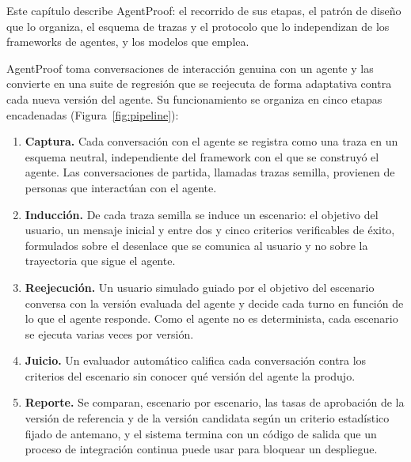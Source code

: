\clearpage
\blank
{}
\begingroup\dobleesp
\vspace{6pt}
Este capítulo describe AgentProof: el recorrido de sus etapas, el patrón de diseño que lo organiza, el esquema de trazas y el protocolo que lo independizan de los frameworks de agentes, y los modelos que emplea.
\par

AgentProof toma conversaciones de interacción genuina con un agente y las convierte en una suite de regresión que se reejecuta de forma adaptativa contra cada nueva versión del agente. Su funcionamiento se organiza en cinco etapas encadenadas (Figura~\ref{fig:pipeline}):
\par
\begin{enumerate}[label=\arabic*.,leftmargin=0.5in,labelwidth=0.25in,labelsep=0pt,align=left,itemsep=0pt,parsep=0pt,topsep=0pt]
  \item \textbf{Captura.} Cada conversación con el agente se registra como una traza en un esquema neutral, independiente del framework con el que se construyó el agente. Las conversaciones de partida, llamadas trazas semilla, provienen de personas que interactúan con el agente.
  \item \textbf{Inducción.} De cada traza semilla se induce un escenario: el objetivo del usuario, un mensaje inicial y entre dos y cinco criterios verificables de éxito, formulados sobre el desenlace que se comunica al usuario y no sobre la trayectoria que sigue el agente.
  \item \textbf{Reejecución.} Un usuario simulado guiado por el objetivo del escenario conversa con la versión evaluada del agente y decide cada turno en función de lo que el agente responde. Como el agente no es determinista, cada escenario se ejecuta varias veces por versión.
  \item \textbf{Juicio.} Un evaluador automático califica cada conversación contra los criterios del escenario sin conocer qué versión del agente la produjo.
  \item \textbf{Reporte.} Se comparan, escenario por escenario, las tasas de aprobación de la versión de referencia y de la versión candidata según un criterio estadístico fijado de antemano, y el sistema termina con un código de salida que un proceso de integración continua puede usar para bloquear un despliegue.
\end{enumerate}

